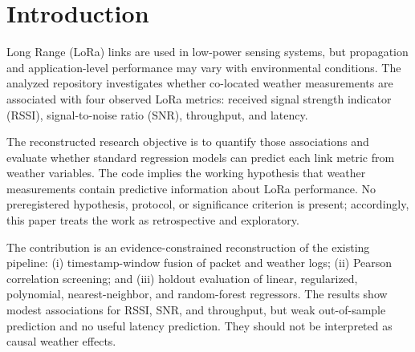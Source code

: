 \section{Introduction}
Long Range (LoRa) links are used in low-power sensing systems, but propagation and application-level performance may vary with environmental conditions. The analyzed repository investigates whether co-located weather measurements are associated with four observed LoRa metrics: received signal strength indicator (RSSI), signal-to-noise ratio (SNR), throughput, and latency.

The reconstructed research objective is to quantify those associations and evaluate whether standard regression models can predict each link metric from weather variables. The code implies the working hypothesis that weather measurements contain predictive information about LoRa performance. No preregistered hypothesis, protocol, or significance criterion is present; accordingly, this paper treats the work as retrospective and exploratory.

The contribution is an evidence-constrained reconstruction of the existing pipeline: (i) timestamp-window fusion of packet and weather logs; (ii) Pearson correlation screening; and (iii) holdout evaluation of linear, regularized, polynomial, nearest-neighbor, and random-forest regressors. The results show modest associations for RSSI, SNR, and throughput, but weak out-of-sample prediction and no useful latency prediction. They should not be interpreted as causal weather effects.
